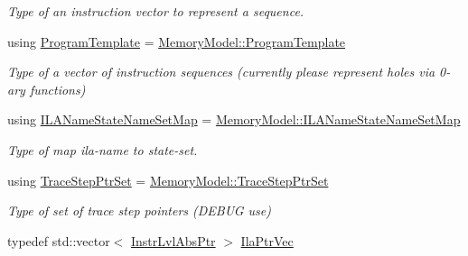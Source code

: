 \begin{DoxyCompactItemize}
\begin{DoxyCompactList}\small\item\em Type of an instruction vector to represent a sequence. \end{DoxyCompactList}\item 
\mbox{\label{classilang_1_1_inter_ila_unroller_acc24c6ee17b58b05e18882d73c5affde}} 
using \mbox{\hyperlink{classilang_1_1_inter_ila_unroller_acc24c6ee17b58b05e18882d73c5affde}{Program\+Template}} = \mbox{\hyperlink{classilang_1_1_memory_model_a72bd17543b5e5cbaefeb994c933622f5}{Memory\+Model\+::\+Program\+Template}}
\begin{DoxyCompactList}\small\item\em Type of a vector of instruction sequences (currently please represent holes via 0-\/ary functions) \end{DoxyCompactList}\item 
\mbox{\label{classilang_1_1_inter_ila_unroller_ab5d4e092989c943ae2978dd9e01e016a}} 
using \mbox{\hyperlink{classilang_1_1_inter_ila_unroller_ab5d4e092989c943ae2978dd9e01e016a}{I\+L\+A\+Name\+State\+Name\+Set\+Map}} = \mbox{\hyperlink{classilang_1_1_memory_model_a9e23cd7d325902a4ab1a4f5d8acea67b}{Memory\+Model\+::\+I\+L\+A\+Name\+State\+Name\+Set\+Map}}
\begin{DoxyCompactList}\small\item\em Type of map ila-\/name to state-\/set. \end{DoxyCompactList}\item 
\mbox{\label{classilang_1_1_inter_ila_unroller_a78cea73f936eeb438cdf33a8e9ccd9f6}} 
using \mbox{\hyperlink{classilang_1_1_inter_ila_unroller_a78cea73f936eeb438cdf33a8e9ccd9f6}{Trace\+Step\+Ptr\+Set}} = \mbox{\hyperlink{classilang_1_1_memory_model_adf275c2b36d17acd5b6e782c1eca7f92}{Memory\+Model\+::\+Trace\+Step\+Ptr\+Set}}
\begin{DoxyCompactList}\small\item\em Type of set of trace step pointers (D\+E\+B\+UG use) \end{DoxyCompactList}\item 
\mbox{\label{classilang_1_1_inter_ila_unroller_aa955b80ccc2435d5c81bb8c3ea3659b2}} 
typedef std\+::vector$<$ \mbox{\hyperlink{namespaceilang_ad1b30fdf347e493b3937143da05d1a72}{Instr\+Lvl\+Abs\+Ptr}} $>$ \mbox{\hyperlink{classilang_1_1_inter_ila_unroller_aa955b80ccc2435d5c81bb8c3ea3659b2}{Ila\+Ptr\+Vec}}

\end{DoxyCompactItemize}
